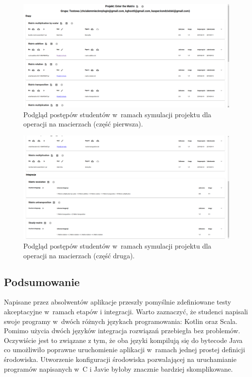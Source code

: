 \begin{figure}[H]
    \centering
    \includegraphics[width = 16cm]{chapter07/matrix_preview_part_1.png}
    \caption{Podgląd postępów studentów w~ramach symulacji projektu dla operacji na macierzach (część pierwsza).}
    \label{fig:matrix_preview_part_1}
\end{figure}

\begin{figure}[H]
    \centering
    \includegraphics[width = 16cm]{chapter07/matrix_preview_part_2.png}
    \caption{Podgląd postępów studentów w~ramach symulacji projektu dla operacji na macierzach (część druga).}
    \label{fig:matrix_preview_part_2}
\end{figure}


\subsection{Podsumowanie}

Napisane przez absolwentów aplikacje przeszły pomyślnie zdefiniowane testy akceptacyjne w~ramach etapów i integracji.
Warto zaznaczyć, że studenci napisali swoje programy w~dwóch różnych językach programowania: Kotlin oraz Scala.
Pomimo użycia dwóch języków integracja rozwiązań przebiegła bez problemów.
Oczywiście jest to związane z tym, że oba języki kompilują się do bytecode Java co umożliwiło poprawne uruchomienie aplikacji w~ramach jednej prostej definicji środowiska.
Utworzenie konfiguracji środowiska pozwalającej na uruchamianie programów napisanych w~C i Javie byłoby znacznie bardziej skomplikowane.

